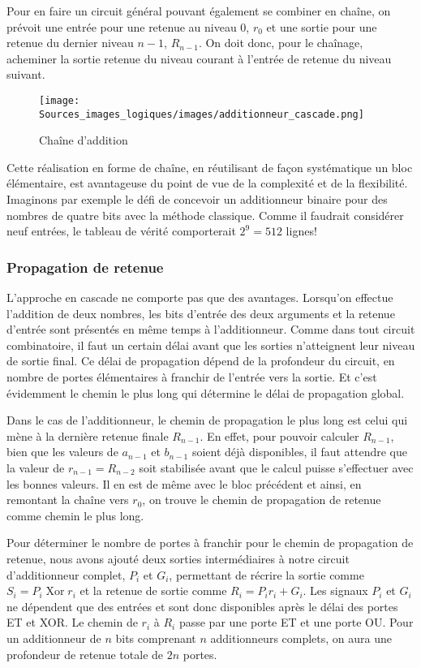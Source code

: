 \documentclass[11pt]{article}
\begin{document}
Pour en faire un circuit général pouvant également se combiner en
chaîne, on prévoit une entrée pour une retenue au niveau 0, \(r_0\) et
une sortie pour une retenue du dernier niveau \(n-1\), \(R_{n-1}\). On
doit donc, pour le chaînage, acheminer la sortie retenue du niveau
courant à l'entrée de retenue du niveau suivant.


\begin{figure}[htbp]
\centering
\texttt{[image: Sources\_images\_logiques/images/additionneur\_cascade.png]}
\caption{\label{fig:orgf21edd0}Chaîne d'addition}
\end{figure}

Cette réalisation en forme de chaîne, en réutilisant de façon
systématique un bloc élémentaire, est avantageuse du point de vue de
la complexité et de la flexibilité. Imaginons par exemple le défi de
concevoir un additionneur binaire pour des nombres de quatre bits avec
la méthode classique. Comme il faudrait considérer neuf entrées, le
tableau de vérité comporterait \(2^9= 512\) lignes!

\subsubsection{Propagation de retenue}
\label{sec:orgfd8790a}

L'approche en cascade ne comporte pas que des avantages. Lorsqu'on
effectue l'addition de deux nombres, les bits d'entrée des deux
arguments et la retenue d'entrée sont présentés en même temps à
l'additionneur.  Comme dans tout circuit combinatoire, il faut un
certain délai avant que les sorties n'atteignent leur niveau de sortie
final.  Ce délai de propagation dépend de la profondeur du circuit, en
nombre de portes élémentaires à franchir de l'entrée vers la
sortie.  Et c'est évidemment le chemin le plus long qui détermine le
délai de propagation global.  

Dans le cas de l'additionneur, le chemin de propagation le plus long
est celui qui mène à la dernière retenue finale \(R_{n-1}\).  En
effet, pour pouvoir calculer \(R_{n-1}\), bien que les valeurs de
\(a_{n-1}\) et \(b_{n-1}\) soient déjà disponibles, il faut attendre
que la valeur de \(r_{n-1} = R_{n-2}\) soit stabilisée avant que le
calcul puisse s'effectuer avec les bonnes valeurs. Il en est de même
avec le bloc précédent et ainsi, en remontant la chaîne vers \(r_0\),
on trouve le chemin de propagation de retenue comme chemin le plus
long.

Pour déterminer le nombre de portes à franchir pour le chemin de
propagation de retenue, nous avons ajouté deux sorties intermédiaires
à notre circuit d'additionneur complet, \(P_i\) et \(G_i\), permettant
de récrire la sortie comme \(S_i = P_i  \operatorname{Xor} r_i\) et la retenue de
sortie comme \(R_i = P_i r_i + G_i\). Les signaux \(P_i\) et \(G_i\)
ne dépendent que des entrées et sont donc disponibles après le délai
des portes ET et XOR. Le chemin de \(r_i\) à \(R_i\) passe par une
porte ET et une porte OU. Pour un additionneur de \(n\) bits
comprenant \(n\) additionneurs complets, on aura une profondeur de
retenue totale de \(2n\) portes.
\end{document}
